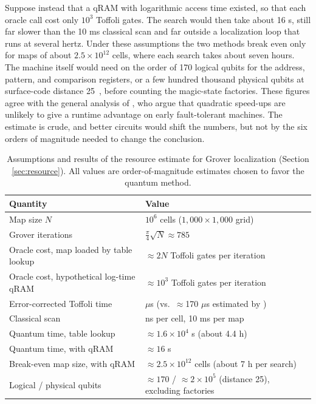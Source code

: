 \documentclass[acmsmall,screen,review]{acmart}
\begin{document}
Suppose instead that a qRAM with logarithmic access time existed, so that each oracle call cost only $10^3$ Toffoli gates. The search would then take about 16 s, still far slower than the 10 ms classical scan and far outside a localization loop that runs at several hertz. Under these assumptions the two methods break even only for maps of about $2.5\times 10^{12}$ cells, where each search takes about seven hours. The machine itself would need on the order of 170 logical qubits for the address, pattern, and comparison registers, or a few hundred thousand physical qubits at surface-code distance 25~\cite{Fowler2012}, before counting the magic-state factories. These figures agree with the general analysis of \citet{Babbush2021}, who argue that quadratic speed-ups are unlikely to give a runtime advantage on early fault-tolerant machines. The estimate is crude, and better circuits would shift the numbers, but not by the six orders of magnitude needed to change the conclusion.

\begin{table}[tbp]
\caption{Assumptions and results of the resource estimate for Grover localization (Section \ref{sec:resource}). All values are order-of-magnitude estimates chosen to favor the quantum method.}
\label{tab:resource}
\footnotesize
\begin{tabular}{@{}>{\raggedright\arraybackslash}p{0.46\dimexpr\linewidth-4\tabcolsep\relax}>{\raggedright\arraybackslash}p{0.54\dimexpr\linewidth-4\tabcolsep\relax}@{}}
\toprule
\textbf{Quantity} & \textbf{Value} \\ \midrule
Map size $N$ & $10^6$ cells ($1{,}000\times 1{,}000$ grid) \\
Grover iterations & $\frac{\pi}{4}\sqrt{N}\approx 785$ \\
Oracle cost, map loaded by table lookup & $\approx 2N$ Toffoli gates per iteration~\cite{Babbush2018} \\
Oracle cost, hypothetical log-time qRAM & $\approx 10^3$ Toffoli gates per iteration \\
Error-corrected Toffoli time & 10 $\mu$s (vs.\ $\approx$170 $\mu$s estimated by \citet{Babbush2021}) \\
Classical scan & 10 ns per cell, 10 ms per map \\
Quantum time, table lookup & $\approx 1.6\times 10^4$ s (about 4.4 h) \\
Quantum time, with qRAM & $\approx 16$ s \\
Break-even map size, with qRAM & $\approx 2.5\times 10^{12}$ cells (about 7 h per search) \\
Logical / physical qubits & $\approx 170$ / $\approx 2\times 10^5$ (distance 25), excluding factories \\
\bottomrule
\end{tabular}
\end{table}
\end{document}
